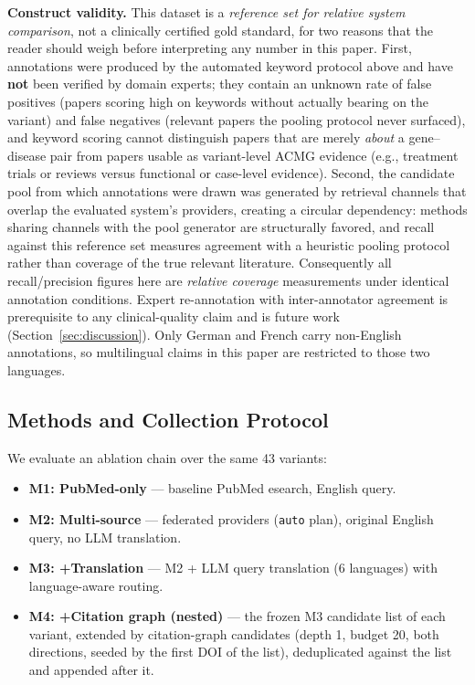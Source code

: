 \documentclass[nonacm,sigconf]{acmart}
\begin{document}
\textbf{Construct validity.} This dataset is a \emph{reference set for
relative system comparison}, not a clinically certified gold standard, for
two reasons that the reader should weigh before interpreting any number in
this paper. First, annotations were produced by the automated keyword
protocol above and have \textbf{not} been verified by domain experts; they
contain an unknown rate of false positives (papers scoring high on keywords
without actually bearing on the variant) and false negatives (relevant
papers the pooling protocol never surfaced), and keyword scoring cannot
distinguish papers that are merely \emph{about} a gene--disease pair from
papers usable as variant-level ACMG evidence (e.g., treatment trials or
reviews versus functional or case-level evidence). Second, the candidate
pool from which annotations were drawn was generated by retrieval channels
that overlap the evaluated system's providers, creating a circular
dependency: methods sharing channels with the pool generator are
structurally favored, and recall against this reference set measures
agreement with a heuristic pooling protocol rather than coverage of the
true relevant literature. Consequently all recall/precision figures here
are \emph{relative coverage} measurements under identical annotation
conditions. Expert re-annotation with inter-annotator agreement is
prerequisite to any clinical-quality claim and is future work
(Section~\ref{sec:discussion}). Only German and French carry non-English
annotations, so multilingual claims in this paper are restricted to those
two languages.

\subsection{Methods and Collection Protocol}
\label{sec:protocol}

We evaluate an ablation chain over the same 43 variants:

\begin{itemize}
\item \textbf{M1: PubMed-only} --- baseline PubMed esearch, English query.
\item \textbf{M2: Multi-source} --- federated providers
(\texttt{auto} plan), original English query, no LLM translation.
\item \textbf{M3: +Translation} --- M2 + LLM query translation
(6 languages) with language-aware routing.
\item \textbf{M4: +Citation graph (nested)} --- the frozen M3 candidate
list of each variant, extended by citation-graph candidates
(depth 1, budget 20, both directions, seeded by the first DOI of the
list), deduplicated against the list and appended after it.
\end{itemize}
\end{document}
